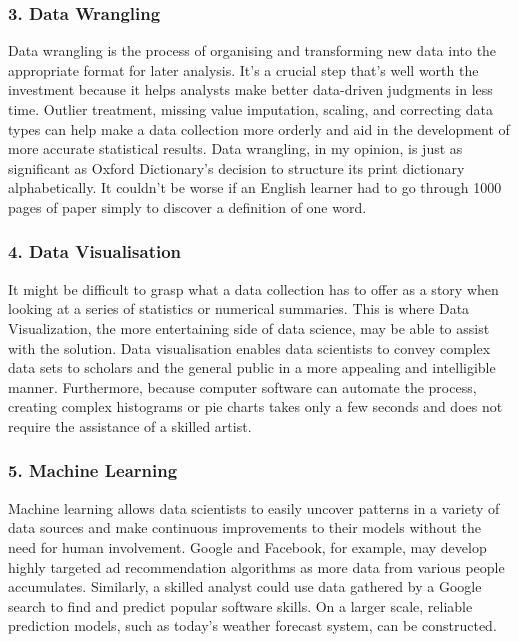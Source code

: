 \documentclass[a4paper, 11pt]{report}
\begin{document}
    \subsubsection{3. Data Wrangling}
    Data wrangling is the process of organising and transforming new data into the appropriate format for later analysis. It's a crucial step that's well worth the investment because it helps analysts make better data-driven judgments in less time. Outlier treatment, missing value imputation, scaling, and correcting data types can help make a data collection more orderly and aid in the development of more accurate statistical results.\cite{isaac4} Data wrangling, in my opinion, is just as significant as Oxford Dictionary's decision to structure its print dictionary alphabetically. It couldn't be worse if an English learner had to go through 1000 pages of paper simply to discover a definition of one word. 

    \subsubsection{4. Data Visualisation}
    It might be difficult to grasp what a data collection has to offer as a story when looking at a series of statistics or numerical summaries. This is where Data Visualization, the more entertaining side of data science, may be able to assist with the solution. Data visualisation enables data scientists to convey complex data sets to scholars and the general public in a more appealing and intelligible manner.\cite{isaac1} Furthermore, because computer software can automate the process, creating complex histograms or pie charts takes only a few seconds and does not require the assistance of a skilled artist.\cite{isaac1}

    \subsubsection{5. Machine Learning}
    Machine learning allows data scientists to easily uncover patterns in a variety of data sources and make continuous improvements to their models without the need for human involvement.\cite{isaac5} Google and Facebook, for example, may develop highly targeted ad recommendation algorithms as more data from various people accumulates. Similarly, a skilled analyst could use data gathered by a Google search to find and predict popular software skills. On a larger scale, reliable prediction models, such as today's weather forecast system, can be constructed.\cite{isaac1}
\end{document}
